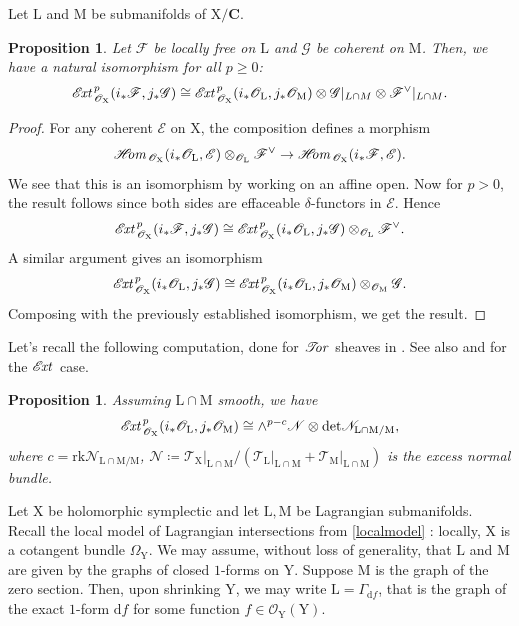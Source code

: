 \documentclass{article}
\theoremstyle{plain}
\newtheorem{proposition}[theorem]{Proposition}
\theoremstyle{definition}
\theoremstyle{remark}
\newcommand{\mr}{\mathrm}
\newcommand{\C}{\mathbf C}
\newcommand{\3}{\vspace{3mm}}
\newcommand{\2}{\vspace{2mm}}
\newcommand{\1}{\vspace{1mm}}
\newcommand*{\shom}{\mathscr{H}\text{\kern -3pt {\it{om}}}\,}
\newcommand*{\ext}{\mathscr{E}\text{\kern -1.5pt {\it{xt}}}\,}
\newcommand*{\tor}{\mathscr{T}\text{\kern -3pt {\it{or}}}\,}
\begin{document}
Let $\mr{L}$ and $\mr{M}$ be submanifolds of $\mr{X}/\C$. 
\2
\begin{proposition}
Let $\mathscr{F}$ be locally free on $\mr{L}$ and $\mathscr{G}$ be coherent on $\mr{M}$. Then, we have a natural isomorphism for all $p \ge 0$: $$\ext^{p}_{\mathscr{O}_\mr{X}}(i_{*}\mathscr{F},j_{*}\mathscr{G}) \cong \ext^{p}_{\mathscr{O}_\mr{X}}(i_{*}\mathscr{O}_{\mr{L}},j_{*}\mathscr{O}_{\mr{M}})\otimes \mathscr{G}|_{L\cap M}\otimes\mathscr{F}^{\vee}|_{L\cap M}.$$
\end{proposition}
\begin{proof}
For any coherent $\mathscr{E}$ on $\mr{X}$, the composition defines a morphism $$\shom_{\mathscr{O}_\mr{X}}(i_*\mathscr{O}_\mr{L},\mathscr{E})\otimes_{\mathscr{O}_\mr{L}}\mathscr{F}^\vee\to \shom_{\mathscr{O}_\mr{X}}(i_*\mathscr{F},\mathscr{E}).$$ We see that this is an isomorphism by working on an affine open. Now for $p>0$, the result follows since both sides are effaceable $\delta$-functors in $\mathscr{E}$. Hence $$\ext^{p}_{\mathscr{O}_\mr{X}}(i_{*}\mathscr{F},j_{*}\mathscr{G}) \cong \ext^{p}_{\mathscr{O}_\mr{X}}(i_{*}\mathscr{O}_{\mr{L}},j_{*}\mathscr{G})\otimes_{\mathscr{O}_\mr{L}}\mathscr{F}^{\vee}.$$ A similar argument gives an isomorphism $$\ext^{p}_{\mathscr{O}_\mr{X}}(i_{*}\mathscr{O}_{\mr{L}},j_{*}\mathscr{G})\cong \ext^{p}_{\mathscr{O}_\mr{X}}(i_{*}\mathscr{O}_{\mr{L}},j_{*}\mathscr{O}_\mr{M})\otimes_{\mathscr{O}_\mr{M}}\mathscr{G}.$$ Composing with the previously established isomorphism, we get the result.
\end{proof}
 Let's recall the following computation, done for $\tor$ sheaves in \cite{MR2030054}. See also \cite{MR2536849} and \cite{MR4678893} for the $\ext$ case.
 \2
\begin{proposition}\label{intersectprop}
 Assuming $\mr{L}\cap \mr{M}$ smooth, we have $$\ext^{p}_{\mathscr{O}_\mr{X}}(i_{*}\mathscr{O}_{\mr{L}},j_{*}\mathscr{O}_{\mr{M}}) \cong \wedge^{p-c} \mathscr{N} \otimes \mr{det}\mathscr{N}_{\mr{\mr{L}\cap\mr{M}/M}},$$ where $c= \mr{rk}\mathscr{N}_{\mr{L\cap M/M}}$, $\mathscr{N} \coloneqq \left.\mathscr{T}_\mr{X}\right|_{\mr{L}\cap \mr{M}}/(\mr{\left.\mathscr{T}_{L}\right|_{L\cap M}+\left.\mathscr{T}_{M}\right|_{L\cap M}})$ is the excess normal bundle.
\end{proposition}
Let $\mr{X}$ be holomorphic symplectic and let $\mr{L,M}$ be Lagrangian submanifolds. Recall the local model of Lagrangian intersections from \cref{localmodel} : locally, $\mr{X}$ is a cotangent bundle $\Omega_\mr{Y}$. We may assume, without loss of generality, that $\mr{L}$ and $\mr{M}$ are given by the graphs of closed $1$-forms on $\mr{Y}$. Suppose $\mr{M}$ is the graph of the zero section. Then, upon shrinking $\mr{Y}$, we may write $\mr{L}=\Gamma_{\mr{d}f}$, that is the graph of the exact $1$-form $\mr{d}f$ for some function $f\in \mathscr{O}_\mr{Y}(\mr{Y})$.\\
\end{document}

